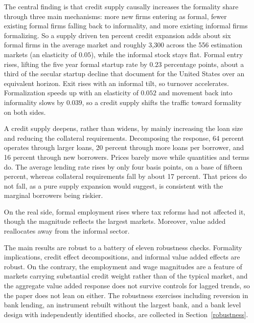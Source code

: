 \documentclass[12pt]{article}
\begin{document}
The central finding is that credit supply causally increases the formality share through three main mechanisms: more new firms entering as formal, fewer existing formal firms falling back to informality, and more existing informal firms formalizing. So a supply driven ten percent credit expansion adds about six formal firms in the average market and roughly 3{,}300 across the 556 estimation markets (an elasticity of $0.05$), while the informal stock stays flat. Formal entry rises, lifting the five year formal startup rate by $0.23$ percentage points, about a third of the secular startup decline that \citet{pugsley2019grown} document for the United States over an equivalent horizon. Exit rises with an informal tilt, so turnover accelerates. Formalization speeds up with an elasticity of $0.052$ and movement back into informality slows by $0.039$, so a credit supply shifts the traffic toward formality on both sides.

A credit supply deepens, rather than widens, by mainly increasing the loan size and reducing the collateral requirements. Decomposing the response, 64 percent operates through larger loans, 20 percent through more loans per borrower, and 16 percent through new borrowers. Prices barely move while quantities and terms do. The average lending rate rises by only four basis points, on a base of fifteen percent, whereas collateral requirements fall by about 17 percent. That prices do not fall, as a pure supply expansion would suggest, is consistent with the marginal borrowers being riskier. 

On the real side, formal employment rises where tax reforms had not affected it, though the magnitude reflects the largest markets. Moreover, value added reallocates away from the informal sector.

The main results are robust to a battery of eleven robustness checks. Formality implications, credit effect decompositions, and informal value added effects are robust. On the contrary, the employment and wage magnitudes are a feature of markets carrying substantial credit weight rather than of the typical market, and the aggregate value added response does not survive controls for lagged trends, so the paper does not lean on either. The robustness exercises including reversion in bank lending, an instrument rebuilt without the largest bank, and a bank level design with independently identified shocks, are collected in Section~\ref{robustness}.
\end{document}
